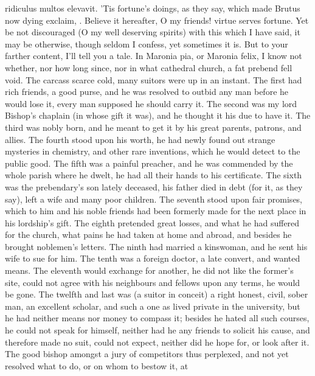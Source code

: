 {ridiculus multos elevavit. 'Tis fortune's doings, as they say, which
made Brutus now dying exclaim, 
. Believe it hereafter, O my friends! virtue serves fortune. Yet be
not discouraged (O my well deserving spirits) with this which I have
said, it may be otherwise, though seldom I confess, yet sometimes it
is. But to your farther content, I'll tell you a tale. In Maronia
pia, or Maronia felix, I know not whether, nor how long since, nor in
what cathedral church, a fat prebend fell void. The carcass scarce
cold, many suitors were up in an instant. The first had rich friends, a
good purse, and he was resolved to outbid any man before he would lose
it, every man supposed he should carry it. The second was my lord
Bishop's chaplain (in whose gift it was), and he thought it his due to
have it. The third was nobly born, and he meant to get it by his great
parents, patrons, and allies. The fourth stood upon his worth, he had
newly found out strange mysteries in chemistry, and other rare
inventions, which he would detect to the public good. The fifth was a
painful preacher, and he was commended by the whole parish where he
dwelt, he had all their hands to his certificate. The sixth was the
prebendary's son lately deceased, his father died in debt (for it, as
they say), left a wife and many poor children. The seventh stood upon
fair promises, which to him and his noble friends had been formerly
made for the next place in his lordship's gift. The eighth pretended
great losses, and what he had suffered for the church, what pains he
had taken at home and abroad, and besides he brought noblemen's
letters. The ninth had married a kinswoman, and he sent his wife to sue
for him. The tenth was a foreign doctor, a late convert, and wanted
means. The eleventh would exchange for another, he did not like the
former's site, could not agree with his neighbours and fellows upon any
terms, he would be gone. The twelfth and last was (a suitor in conceit)
a right honest, civil, sober man, an excellent scholar, and such a one
as lived private in the university, but he had neither means nor money
to compass it; besides he hated all such courses, he could not speak
for himself, neither had he any friends to solicit his cause, and
therefore made no suit, could not expect, neither did he hope for, or
look after it. The good bishop amongst a jury of competitors thus
perplexed, and not yet resolved what to do, or on whom to bestow it, at
}
